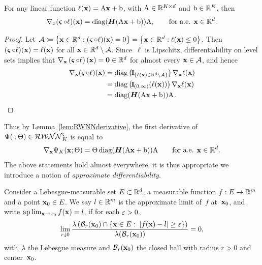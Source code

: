 \begin{lemma}\label{lem:RWNNderivative}
For any linear function $\ell(\mathbf{x})=\mathrm{A} \mathbf{x} + \mathrm{b}$, with $\mathrm{A}\in\mathbb{R}^{K\times d}$ and $\mathrm{b}\in\mathbb{R}^K$, then
\[
\nabla_x(\operatorname{\boldsymbol\varsigma}\circ \ell)(\mathbf{x}) = \operatorname{diag}(\boldsymbol{H}(\mathrm{A} \mathbf{x}+\mathrm{b}))\mathrm{A},
\qquad \text{for a.e. } \mathbf{x}\in\mathbb{R}^d.
\]
\end{lemma}
\begin{proof}
Let $\mathcal{A}\coloneqq\left\{\mathbf{x}\in\mathbb{R}^d: (\operatorname{\boldsymbol\varsigma}\circ\ell)(\mathbf{x})=0\right\}
=\left\{\mathbf{x}\in\mathbb{R}^d:\ell(\mathbf{x})\leq 0\right\}$. 
Then ${(\operatorname{\boldsymbol\varsigma}\circ\ell)(\mathbf{x})=\ell(\mathbf{x})}$ for all $\mathbf{x}\in\mathbb{R}^d\setminus\mathcal{A}$.
Since~$\ell$ is Lipschitz,
differentiability on level sets \cite[Section~3.1.2,~Corollary~I]{Evans1992MeasureFunctions} implies that
$\nabla_{\mathbf{x}}\left(\operatorname{\boldsymbol\varsigma}\circ\ell\right)(\mathbf{x}) = \boldsymbol{0}\in\mathbb{R}^d$
for almost every $\mathbf{x}\in\mathcal{A}$,
and hence
\begin{align*}
\nabla_{\xxbf}(\brelu\circ\ell)(\xxbf)
&=\operatorname{diag}\left(\ind_{\{\ell(\xxbf)\in\RR^d\setminus\Aa\}}\right)\nabla_{\xxbf}\ell(\xxbf) \\
&=\operatorname{diag}\left(\ind_{(0,\infty)}(\ell(\xxbf))\right)\nabla_{\xxbf}\ell(\xxbf) \\
&=\operatorname{diag}(\Hb(\Am \xxbf+\bm))\Am\,.
\end{align*}
\end{proof}
Thus by Lemma~\ref{lem:RWNNderivative}, the first derivative of $\Psi(\cdot;\Theta)\in\mathcal{RWNN}^{\varsigma}_K$ is equal to 
\begin{equation}\label{eq:RWNN1stderivative}
    \nabla_{\mathbf{x}}\Psi_K(\mathbf{x}; \Theta)
    = \Theta\operatorname{diag}(\boldsymbol{H}(\mathrm{A} \mathbf{x}+\mathrm{b}))\mathrm{A}
    \qquad \text{for a.e. } \mathbf{x}\in\mathbb{R}^d.
\end{equation}
The above statements hold almost everywhere, it is thus appropriate we introduce a notion of \textit{approximate differentiability}.
\begin{definition}
Consider a Lebesgue-measurable set $E \subset \mathbb{R}^d$, a measurable function $f: E \rightarrow \mathbb{R}^m$ and a point $\boldsymbol{\mathrm{x}}_0 \in E$. We say $l \in \mathbb{R}^m$ is the approximate limit of~$f$ at~$\boldsymbol{\mathrm{x}}_0$, and write
$\mathrm{ap}\lim_{\mathbf{x} \rightarrow x_0} f(\mathbf{x})=l$,
if for each $\varepsilon>0$,
\[
\lim _{r \downarrow 0} \frac{\lambda\left(\mathcal{B}_r(\boldsymbol{\mathrm{x}}_0) \cap\left\{\mathbf{x}\in E:\;|f(\mathbf{x})-l| \geq \varepsilon\right\}\right)}{\lambda(\mathcal{B}_r(\boldsymbol{\mathrm{x}}_0))}=0,
\]
with~$\lambda$ the Lebesgue measure and $\mathcal{B}_r(\boldsymbol{\mathrm{x}}_0)$ the closed ball with radius $r>0$ and center~$\boldsymbol{\mathrm{x}}_0$.
\end{definition}
